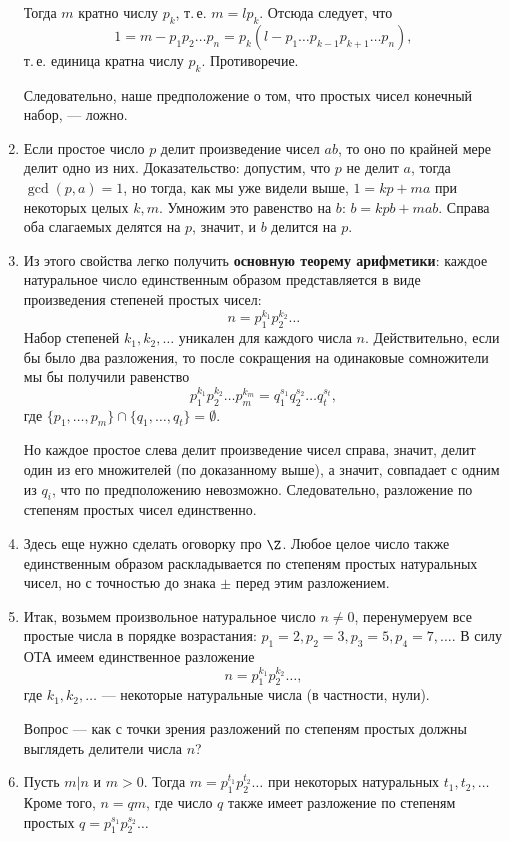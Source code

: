 \begin{enumerate}
Тогда $m$ кратно числу $p_k$, т.\,е. $m=lp_k$. Отсюда следует, что
$$
1=m-p_1p_2\dots p_n = p_k(l-p_1\dots p_{k-1}p_{k+1}\dots p_n),
$$
т.\,е. единица кратна числу $p_k$. Противоречие.

Следовательно, наше предположение о том, что простых чисел конечный набор, --- ложно.

\item Если простое число $p$ делит произведение чисел $ab$, то оно по крайней мере делит одно из них. Доказательство: допустим, что $p$ не делит $a$, тогда $\gcd(p,a)=1$, но тогда, как мы уже видели выше, $1=kp+ma$ при некоторых целых $k,m$. Умножим это равенство на $b$: $b=kpb+mab$. Справа оба слагаемых делятся на $p$, значит, и $b$ делится на $p$.
\item Из этого свойства легко получить \textbf{основную теорему арифметики}: каждое натуральное число единственным образом представляется в виде произведения степеней простых чисел:
$$
n=p_1^{k_1}p_2^{k_2}\dots
$$
Набор степеней $k_1,k_2,\dots$ уникален для каждого числа $n$. Действительно, если бы было два разложения, то после сокращения на одинаковые сомножители мы бы получили равенство
$$
p_1^{k_1}p_2^{k_2}\dots p_m^{k_m} = q_1^{s_1}q_2^{s_2}\dots q_t^{s_t},
$$
где $\{p_1,\dots,p_m\}\cap\{q_1,\dots,q_t\}=\emptyset$.

Но каждое простое слева делит произведение чисел справа, значит, делит один из его множителей (по доказанному выше), а значит, совпадает с одним из $q_i$, что по предположению невозможно. Следовательно, разложение по степеням простых чисел единственно.
\item Здесь еще нужно сделать оговорку про $\Z$. Любое целое число также единственным образом раскладывается по степеням простых натуральных чисел, но с точностью до знака $\pm$ перед этим разложением.

\item Итак, возьмем произвольное натуральное число $n\ne 0$, перенумеруем все простые числа в порядке возрастания: $p_1=2, p_2=3, p_3=5, p_4=7,\dots$. В силу ОТА имеем единственное разложение
$$
n=p_1^{k_1}p_2^{k_2}\dots,
$$
где $k_1,k_2,\dots$ --- некоторые натуральные числа (в частности, нули).


Вопрос --- как с точки зрения разложений по степеням простых должны выглядеть делители числа $n$?

\item Пусть $m|n$ и $m>0$. Тогда $m=p_1^{t_1}p_2^{t_2}\dots$ при некоторых натуральных $t_1,t_2,\dots$
Кроме того, $n=qm$, где число $q$ также имеет разложение по степеням простых $q=p_1^{s_1}p_2^{s_2}\dots$


\end{enumerate}
